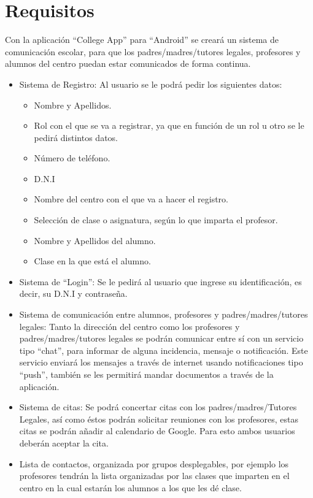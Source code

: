 %
%
%
%

\cleardoublepage
\chapter{Requisitos}
\label{chap:requirements}

Con la aplicaci\'on ``College App'' para ``Android'' se crear\'a un sistema de comunicaci\'on escolar, para que los padres/madres/tutores legales, profesores y alumnos del centro puedan estar comunicados de forma continua.

\begin{itemize}
	\item Sistema de Registro: Al usuario se le podr\'a pedir los siguientes datos:
		\begin{itemize}
			\item Nombre y Apellidos.
			\item Rol con el que se va a registrar, ya que en funci\'on de un rol u otro se le pedir\'a distintos datos.
			\item N\'umero de tel\'efono.
			\item D.N.I
			\item Nombre del centro con el que va a hacer el registro.
			\item Selecci\'on de clase o asignatura, seg\'un lo que imparta el profesor.
			\item Nombre y Apellidos del alumno.
			\item Clase en la que est\'a el alumno. %
		\end{itemize}
	\item Sistema de ``Login'': Se le pedir\'a al usuario que ingrese su identificaci\'on, es decir, su D.N.I y contrase\~na.
	\item Sistema de comunicaci\'on entre alumnos, profesores y padres/madres/tutores legales: Tanto la direcci\'on del centro como los profesores y padres/madres/tutores legales se podr\'an comunicar entre s\'i con un servicio tipo ``chat'', para informar de alguna incidencia, mensaje o notificaci\'on. Este servicio enviar\'a los mensajes a trav\'es de internet usando notificaciones tipo ``push'', tambi\'en se les permitir\'a mandar documentos a trav\'es de la aplicaci\'on.
	\item Sistema de citas: Se podr\'a concertar citas con los padres/madres/Tutores Legales, as\'i como \'estos podr\'an solicitar reuniones con los profesores, estas citas se podr\'an a\~nadir al calendario de Google. Para esto ambos usuarios deber\'an aceptar la cita.
	\item Lista de contactos, organizada por grupos desplegables, por ejemplo los profesores tendr\'an la lista organizadas por las clases que imparten en el centro en la cual estar\'an los alumnos a los que les d\'e clase.
\end{itemize}

